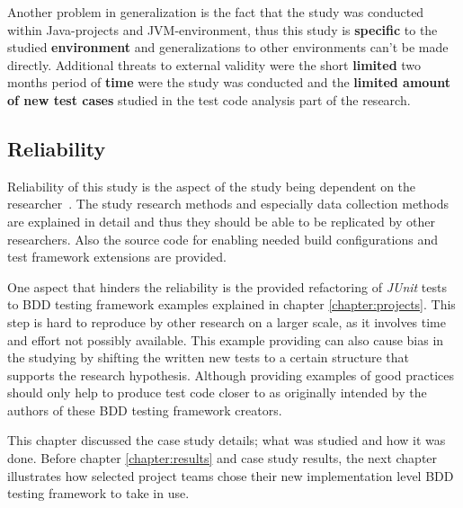 Another problem in generalization is the fact that the study was conducted within Java-projects and JVM-environment, thus this
study is \textbf{specific} to the studied \textbf{environment} and generalizations to other environments can't be made directly.
Additional threats to external validity were the short
\textbf{limited} two months period of \textbf{time} were the study was conducted and the \textbf{limited amount of new test cases} studied
in the test code analysis part of the research.

\subsection{Reliability}
Reliability of this study is the aspect of the study being dependent on the researcher~\cite{runeson2012case}. The study
research methods and especially data collection methods are explained in detail and thus they should be able to be replicated by other researchers.
Also the source code for enabling needed build configurations and test framework extensions are provided.

One aspect that hinders the reliability is the provided refactoring of \textit{JUnit} tests to BDD testing framework examples explained
in chapter \ref{chapter:projects}. This step is hard to reproduce by other research on a larger scale, as it involves time and effort not
possibly available. This example providing can also cause bias in the studying by
shifting the written new tests to a certain structure that supports the research hypothesis. Although providing examples
of good practices should only help to produce test code closer to as originally intended by the authors of these BDD testing framework creators.

This chapter discussed the case study details; what was studied and how it was done. Before chapter \ref{chapter:results} and case study results,
the next chapter illustrates how selected project teams chose their new implementation level BDD testing framework to take in use.



